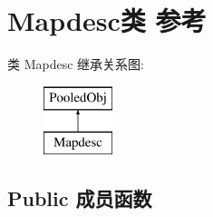 \hypertarget{class_mapdesc}{}\section{Mapdesc类 参考}
\label{class_mapdesc}
类 Mapdesc 继承关系图\+:\begin{figure}[H]
\begin{center}
\leavevmode
\includegraphics[height=2.000000cm]{class_mapdesc}
\end{center}
\end{figure}
\subsection*{Public 成员函数}
